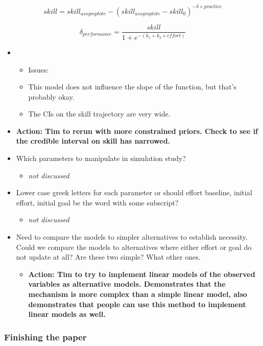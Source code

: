 \documentclass[]{article}
\providecommand{\tightlist}{%
  \setlength{\itemsep}{0pt}\setlength{\parskip}{0pt}}
\begin{document}
\[skill = skill_{assymptote} - (skill_{assymptote} - skill_0)^{-\delta \times practice}\]

\[\delta_{performance} = \frac{skill}{1 + e^{-(k_1 + k_2 \times effort)}}\]

\begin{itemize}
\item
  \begin{itemize}
  \item
    Issues:
  \item
    This model does not influence the slope of the function, but that's
    probably okay.
  \item
    The CIs on the skill trajectory are very wide.
  \end{itemize}
\item
  \textbf{Action: Tim to rerun with more constrained priors. Check to
  see if the credible interval on skill has narrowed.}
\item
  Which parameters to manipulate in simulation study?

  \begin{itemize}
  \tightlist
  \item
    \emph{not discussed}
  \end{itemize}
\item
  Lower case greek letters for each parameter or should effort baseline,
  initial effort, initial goal be the word with some subscript?

  \begin{itemize}
  \tightlist
  \item
    \emph{not discussed}
  \end{itemize}
\item
  Need to compare the models to simpler alternatives to establish
  necessity. Could we compare the models to alternatives where either
  effort or goal do not update at all? Are these two simple? What other
  ones.

  \begin{itemize}
  \tightlist
  \item
    \textbf{Action: Tim to try to implement linear models of the
    observed variables as alternative models. Demonstrates that the
    mechanism is more complex than a simple linear model, also
    demonstrates that people can use this method to implement linear
    models as well.}
  \end{itemize}
\end{itemize}

\hypertarget{finishing-the-paper}{%
\subsubsection{Finishing the paper}\label{finishing-the-paper}}
\end{document}
